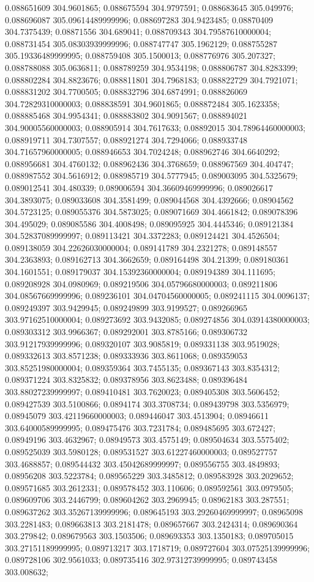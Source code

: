 0.088651609 304.9601865; 0.088675594 304.9797591; 0.088683645 305.049976; 0.088696087 305.09614489999996; 0.088697283 304.9423485; 0.08870409 304.7375439; 0.08871556 304.689041; 0.088709343 304.79587610000004; 0.088731454 305.08303939999996; 0.088747747 305.1962129; 0.088755287 305.19336489999995; 0.088759408 305.1500013; 0.088776976 305.207327; 0.088788088 305.0636811; 0.088789259 304.9534198; 0.088806787 304.8283399; 0.088802284 304.8823676; 0.088811801 304.7968183; 0.088822729 304.7921071; 0.088831202 304.7700505; 0.088832796 304.6874991; 0.088826069 304.72829310000003; 0.088838591 304.9601865; 0.088872484 305.1623358; 0.088885468 304.9954341; 0.088883802 304.9091567; 0.088894021 304.90005560000003; 0.088905914 304.7617633; 0.08892015 304.78964460000003; 0.088919711 304.7307557; 0.088921274 304.7294066; 0.088933748 304.71657960000005; 0.088946653 304.7024248; 0.088962746 304.6640292; 0.088956681 304.4760132; 0.088962436 304.3768659; 0.088967569 304.404747; 0.088987552 304.5616912; 0.088985719 304.5777945; 0.089003095 304.5325679; 0.089012541 304.480339; 0.089006594 304.36609469999996; 0.089026617 304.3893075; 0.089033608 304.3581499; 0.089044568 304.4392666; 0.08904562 304.5723125; 0.089055376 304.5873025; 0.089071669 304.4661842; 0.089078396 304.495029; 0.089085586 304.4008498; 0.089095925 304.4445346; 0.089121384 304.52837089999997; 0.089113421 304.3372283; 0.089124421 304.4526504; 0.089138059 304.22626030000004; 0.089141789 304.2321278; 0.089148557 304.2363893; 0.089162713 304.3662659; 0.089164498 304.21399; 0.089180361 304.1601551; 0.089179037 304.15392360000004; 0.089194389 304.111695; 0.089208928 304.0980969; 0.089219506 304.05796680000003; 0.089211806 304.08567669999996; 0.089236101 304.04704560000005; 0.089241115 304.0096137; 0.089249397 303.9429945; 0.089249899 303.9199527; 0.089266965 303.97162510000004; 0.089273692 303.9432085; 0.089274856 304.03914380000003; 0.089303312 303.9966367; 0.089292001 303.8785166; 0.089306732 303.91217939999996; 0.089320107 303.9085819; 0.089331138 303.9519028; 0.089332613 303.8571238; 0.089333936 303.8611068; 0.089359053 303.85251980000004; 0.089359364 303.7455135; 0.089367143 303.8354312; 0.089371224 303.8325832; 0.089378956 303.8623488; 0.089396484 303.88027239999997; 0.089410481 303.7620023; 0.089405308 303.5606452; 0.089427539 303.5100866; 0.0894174 303.3708734; 0.089439798 303.5356979; 0.08945079 303.42119660000003; 0.089446047 303.4513904; 0.08946611 303.64000589999995; 0.089475476 303.7231784; 0.089485695 303.672427; 0.08949196 303.4632967; 0.08949573 303.4575149; 0.089504634 303.5575402; 0.089525039 303.5980128; 0.089531527 303.61227460000003; 0.089527757 303.4688857; 0.089544432 303.45042689999997; 0.089556755 303.4849893; 0.08956208 303.5223784; 0.089565229 303.3485812; 0.089583928 303.2029652; 0.089571685 303.2612331; 0.089578452 303.110606; 0.089592561 303.0979505; 0.089609706 303.2446799; 0.089604262 303.2969945; 0.08962183 303.287551; 0.089637262 303.35267139999996; 0.089645193 303.29260469999997; 0.08965098 303.2281483; 0.089663813 303.2181478; 0.089657667 303.2424314; 0.089690364 303.279842; 0.089679563 303.1503506; 0.089693353 303.1350183; 0.089705015 303.27151189999995; 0.089713217 303.1718719; 0.089727604 303.07525139999996; 0.089728106 302.9561033; 0.089735416 302.97312739999995; 0.089743458 303.008632; 